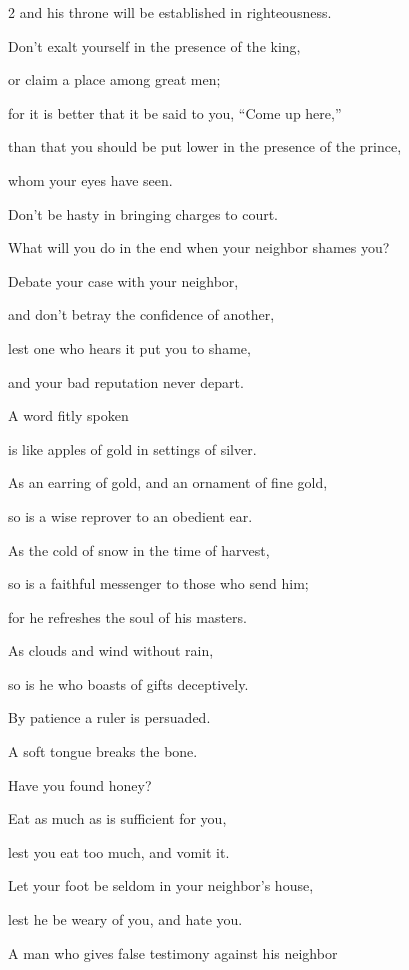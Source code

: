 \begin{multicols}{2}
and his throne will be established in righteousness.


\myverse{}Don’t exalt yourself in the presence of the king,

or claim a place among great men;


\myverse{}for it is better that it be said to you, “Come up here,”

than that you should be put lower in the presence of the prince,

whom your eyes have seen.


\myverse{}Don’t be hasty in bringing charges to court.

What will you do in the end when your neighbor shames you?


\myverse{}Debate your case with your neighbor,

and don’t betray the confidence of another,


\myverse{}lest one who hears it put you to shame,

and your bad reputation never depart.


\vspace{\baselineskip} 
\myverse{}A word fitly spoken

is like apples of gold in settings of silver.


\myverse{}As an earring of gold, and an ornament of fine gold,

so is a wise reprover to an obedient ear.


\myverse{}As the cold of snow in the time of harvest,

so is a faithful messenger to those who send him;

for he refreshes the soul of his masters.


\myverse{}As clouds and wind without rain,

so is he who boasts of gifts deceptively.


\myverse{}By patience a ruler is persuaded.

A soft tongue breaks the bone.


\myverse{}Have you found honey?

Eat as much as is sufficient for you,

lest you eat too much, and vomit it.


\myverse{}Let your foot be seldom in your neighbor’s house,

lest he be weary of you, and hate you.


\myverse{}A man who gives false testimony against his neighbor


\end{multicols}
